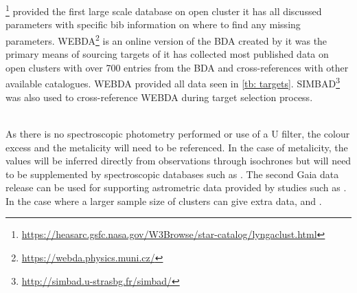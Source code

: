 %
% 
%
\pagebreak
\smallskip
{}\\ 
\smallskip\\
\cite{1982A&A...109..213L}\footnote{\url{https://heasarc.gsfc.nasa.gov/W3Browse/star-catalog/lyngaclust.html}} provided the first large scale database on open cluster it has all discussed parameters with specific bib information on where to find any missing parameters. WEBDA\footnote{\url{https://webda.physics.muni.cz/}} is an online version of the BDA created by \cite{1995ASSL..203..127M} it was the primary means of sourcing targets of it has collected most published data on open clusters with over 700 entries from the BDA and cross-references with other available catalogues. WEBDA provided all data seen in \cref{tb: targets}. SIMBAD\footnote{\url{http://simbad.u-strasbg.fr/simbad/}} was also used to cross-reference WEBDA during target selection process. 

\smallskip\\
As there is no spectroscopic photometry performed or use of a U filter, the colour excess and the metalicity will need to be referenced. In the case of metalicity, the values will be inferred directly from observations through isochrones but will need to be supplemented by spectroscopic databases such as \cite{Metallicity_catalogue}. The second Gaia data release can be used for supporting astrometric data provided by studies such as \cite{2020A&A...640A...1C}. In the case where a larger sample size of clusters can give extra data, \cite{2022MNRAS.509.1664J} and \cite{2006A&A...446..121B}.



